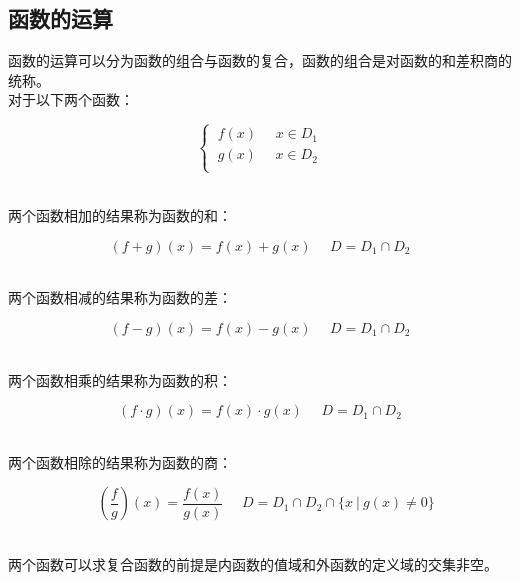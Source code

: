 \documentclass[UTF8]{ctexart}
\begin{document}
\subsection{函数的运算}
    函数的运算可以分为函数的组合与函数的复合，函数的组合是对函数的和差积商的统称。\\[3mm]
    对于以下两个函数：
    \begin{large}
        \begin{equation*}
            \begin{cases}
                ~f(x)~~~~~~x\in D_1\\[1mm]
                ~g(x)~~~~~~x\in D_2\\[1mm]
            \end{cases}
        \end{equation*}
    \end{large}\\[2mm]
    两个函数相加的结果称为函数的和：
    \begin{large}
        \begin{equation*}
            (f+g)(x)=f(x)+g(x)~~~~~~D=D_1\cap D_2
        \end{equation*}
    \end{large}\\
    两个函数相减的结果称为函数的差：
    \begin{large}
        \begin{equation*}
            (f-g)(x)=f(x)-g(x)~~~~~~D=D_1\cap D_2
        \end{equation*}
    \end{large}\\
    两个函数相乘的结果称为函数的积：
    \begin{large}
        \begin{equation*}
            (f\cdot g)(x)=f(x)\cdot g(x)~~~~~~D=D_1\cap D_2
        \end{equation*}
    \end{large}\\
    两个函数相除的结果称为函数的商：\vspace{2pt}
    \begin{large}
        \begin{equation*}
            ~~~~\left(\frac{f}{g}\right)(x)=\frac{f(x)}{g(x)}~~~~~~D=D_1\cap D_2\cap\{x~|~g(x)\neq 0\}
        \end{equation*}
    \end{large}\\[2mm]
    两个函数可以求复合函数的前提是内函数的值域和外函数的定义域的交集非空。\\[3mm]
\end{document}
